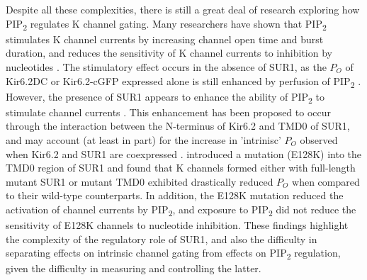 Despite all these complexities, there is still a great deal of research exploring how PIP\textsubscript{2} regulates K\ATP{} channel gating.
Many researchers have shown that PIP\textsubscript{2} stimulates K\ATP{} channel currents by increasing channel open time and burst duration, and reduces the sensitivity of K\ATP{} channel currents to inhibition by nucleotides \cite{fan_phosphoinositides_1999, baukrowitz_pip2_1998, shyng_membrane_1998, fan_phosphoinositides_1999, enkvetchakul_kinetic_2000}.
The stimulatory effect occurs in the absence of SUR1, as the $P_O$ of Kir6.2\textgreek{D}C or Kir6.2-cGFP expressed alone is still enhanced by perfusion of PIP\textsubscript{2} \cite{fan_phosphoinositides_1999, enkvetchakul_kinetic_2000}.
However, the presence of SUR1 appears to enhance the ability of PIP\textsubscript{2} to stimulate channel currents \cite{baukrowitz_pip2_1998, shyng_membrane_1998, fan_phosphoinositides_1999, enkvetchakul_kinetic_2000}.
This enhancement has been proposed to occur through the interaction between the N-terminus of Kir6.2 and TMD0 of SUR1, and may account (at least in part) for the increase in 'intrinisc' $P_O$ observed when Kir6.2 and SUR1 are coexpressed \cite{pratt_n-terminal_2011}.
\textcite{pratt_n-terminal_2011} introduced a mutation (E128K) into the TMD0 region of SUR1 and found that K\ATP{} channels formed either with full-length mutant SUR1 or mutant TMD0 exhibited drastically reduced $P_O$ when compared to their wild-type counterparts.
In addition, the E128K mutation reduced the activation of channel currents by PIP\textsubscript{2}, and exposure to PIP\textsubscript{2} did not reduce the sensitivity of E128K channels to nucleotide inhibition.
These findings highlight the complexity of the regulatory role of SUR1, and also the difficulty in separating effects on intrinsic channel gating from effects on PIP\textsubscript{2} regulation, given the difficulty in measuring and controlling the latter.

